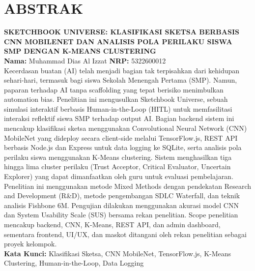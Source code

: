 \documentclass[12pt,a4paper,oneside,openany]{report}
\begin{document}
\chapter*{ABSTRAK}
\thispagestyle{empty}
\textbf{SKETCHBOOK UNIVERSE: KLASIFIKASI SKETSA BERBASIS CNN MOBILENET DAN ANALISIS POLA PERILAKU SISWA SMP DENGAN K-MEANS CLUSTERING}\\[0.5cm]
\textbf{Nama:} Muhammad Dias Al Izzat \quad \textbf{NRP:} 5322600012\\[1cm]
Kecerdasan buatan (AI) telah menjadi bagian tak terpisahkan dari kehidupan sehari-hari, termasuk bagi siswa Sekolah Menengah Pertama (SMP). Namun, paparan terhadap AI tanpa scaffolding yang tepat berisiko menimbulkan automation bias. Penelitian ini mengusulkan Sketchbook Universe, sebuah simulasi interaktif berbasis Human-in-the-Loop (HITL) untuk memfasilitasi interaksi reflektif siswa SMP terhadap output AI. Bagian backend sistem ini mencakup klasifikasi sketsa menggunakan Convolutional Neural Network (CNN) MobileNet yang dideploy secara client-side melalui TensorFlow.js, REST API berbasis Node.js dan Express untuk data logging ke SQLite, serta analisis pola perilaku siswa menggunakan K-Means clustering. Sistem menghasilkan tiga hingga lima cluster perilaku (Trust Acceptor, Critical Evaluator, Uncertain Explorer) yang dapat dimanfaatkan oleh guru untuk evaluasi pembelajaran. Penelitian ini menggunakan metode Mixed Methods dengan pendekatan Research and Development (R\&D), metode pengembangan SDLC Waterfall, dan teknik analisis Fishbone 6M. Pengujian dilakukan menggunakan akurasi model CNN dan System Usability Scale (SUS) bersama rekan penelitian. Scope penelitian mencakup backend, CNN, K-Means, REST API, dan admin dashboard, sementara frontend, UI/UX, dan maskot ditangani oleh rekan penelitian sebagai proyek kelompok.\\[1cm]
\textbf{Kata Kunci:} Klasifikasi Sketsa, CNN MobileNet, TensorFlow.js, K-Means Clustering, Human-in-the-Loop, Data Logging
\newpage

\end{document}
